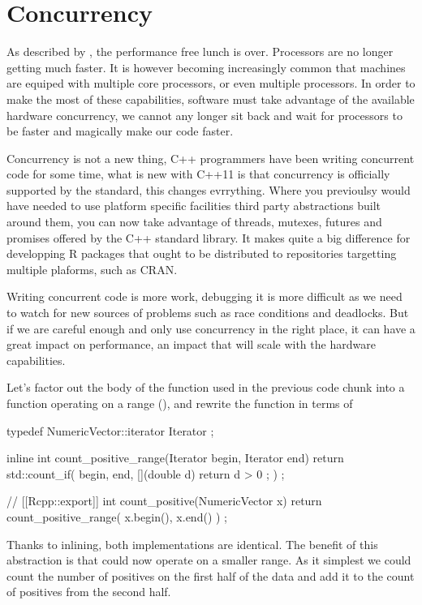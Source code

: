 \section{Concurrency}

As described by \citep{sutter2005}, the performance free lunch is over. Processors
are no longer getting much faster. It is however becoming
increasingly common that machines are equiped with multiple core processors, or
even multiple processors. In order to make the most of these
capabilities, software must take advantage of the available hardware
concurrency, we cannot any longer sit back and wait for processors to be faster
and magically make our code faster.

Concurrency is not a new thing, C++ programmers have been writing concurrent
code for some time, what is new with C++11 is that concurrency
is officially supported by the standard, this changes evrrything.
Where you previoulsy would have needed to use platform specific facilities
third party abstractions built around them, you can now take advantage
of threads, mutexes, futures and promises offered by the C++ standard
library. It makes quite a big difference for developping
R packages that ought to be distributed to repositories targetting
multiple plaforms, such as CRAN.

Writing concurrent code is more work, debugging it is more difficult as we need
to watch for new sources of problems such as race conditions and deadlocks. But
if we are careful enough and only use concurrency in the right place, it can
have a great impact on performance, an impact that will scale with the
hardware capabilities.

Let's factor out the body of the function used in the previous code chunk
into a function operating on a range (),
and rewrite the  function in terms of

\begin{example}
typedef NumericVector::iterator Iterator ;

inline int count_positive_range(Iterator begin, Iterator end){
  return std::count_if( begin, end,
    [](double d){ return d > 0 ;}
  ) ;
}

// [[Rcpp::export]]
int count_positive(NumericVector x){
  return count_positive_range( x.begin(), x.end() ) ;
}
\end{example}

Thanks to inlining, both implementations are identical. The benefit of
this abstraction is that  could now
operate on a smaller range. As it simplest we could count the
number of positives on the first half of the data and add it to
the count of positives from the second half.

